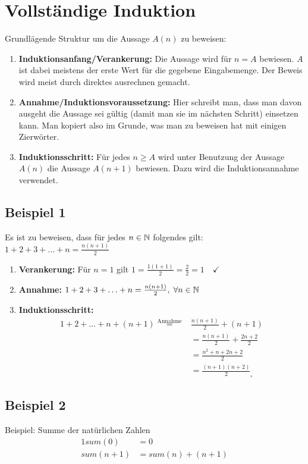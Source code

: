 \section{Vollständige Induktion}
Grundlägende Struktur um die Aussage $A(n)$ zu beweisen:
\begin{enumerate}
	\item \textbf{Induktionsanfang/Verankerung:} Die Aussage wird für $n = A$ bewiesen.
	$A$ ist dabei meistens der erste Wert für die gegebene Eingabemenge.
	Der Beweis wird meist durch direktes ausrechnen gemacht.
	\item \textbf{Annahme/Induktionsvoraussetzung:} Hier schreibt man,
	dass man davon ausgeht die Aussage sei gültig (damit man sie im nächsten Schritt)
	einsetzen kann. Man kopiert also im Grunde, was man zu beweisen hat mit einigen Zierwörter.
	\item \textbf{Induktionsschritt:} Für jedes $n \geq A$ wird unter Benutzung der Aussage $A(n)$
	die Aussage $A(n+1)$ bewiesen. Dazu wird die Induktionsannahme verwendet.
\end{enumerate}

\subsection*{Beispiel 1}
Es ist zu beweisen, dass für jedes $n \in \mathbb{N}$ folgendes gilt: $1 + 2 + 3 + \ldots + n = \frac{n(n + 1)}{2}$
\begin{enumerate}
	\item \textbf{Verankerung:} Für $n = 1$ gilt $1 = \frac{1 (1 + 1)}{2} = \frac{2}{2} = 1 \quad \checkmark$ 
	\item \textbf{Annahme:} $1 + 2 + 3 + \ldots + n = \frac{n(n+1)}{2}, \; \forall n \in \mathbb{N}$
	\item \textbf{Induktionsschritt:}
	\begin{align*}
	1 + 2 + \ldots + n + (n+1) \overset{\text{Annahme}}{=} & \frac{n(n+1)}{2} + (n + 1)\\
	&= \frac{n(n+1)}{2} + \frac{2n + 2}{2} \\
	&= \frac{n^2 + n + 2n + 2}{2} \\
	&= \frac{(n + 1)(n + 2)}{2} _\square
	\end{align*}
\end{enumerate}


\subsection*{Beispiel 2}
		Beispiel: Summe der natürlichen Zahlen
		\begin{alignat}{1}
		 sum(0) & = 0\\
		 sum (n+1) & = sum(n) + (n + 1) 
		\end{alignat}		
		
